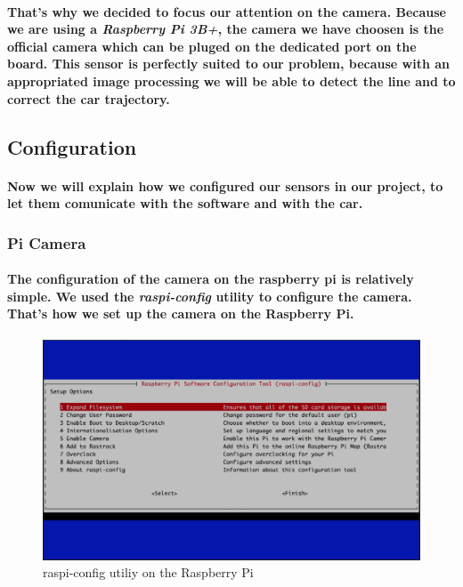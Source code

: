 \paragraph{That's why we decided to focus our attention on the camera. Because
we are using a \textit{Raspberry Pi 3B+}, the camera we have choosen is the official 
camera which can be pluged on the dedicated port on the board. This sensor is
perfectly suited to our problem, because with an appropriated image processing
we will be able to detect the line and to correct the car trajectory. 
}

\subsection{Configuration}

\paragraph{Now we will explain how we configured our sensors in our project, to
let them comunicate with the software and with the car.}

\subsubsection{Pi Camera}
\paragraph{The configuration of the camera on the raspberry pi is relatively simple. We
used the \textit{raspi-config} utility to configure the camera. That's how we set up
the camera on the Raspberry Pi.}

\begin{figure}[h!]
    \begin{center}
        \includegraphics[scale=0.3]{Images/Raspi_config.png}
    \end{center}
    \caption{raspi-config utiliy on the Raspberry Pi}
    \label{fig:raspi_config}
\end{figure}

